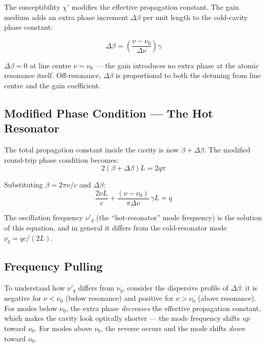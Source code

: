 The susceptibility $\chi'$ modifies the effective propagation constant. The gain medium adds an extra phase increment $\Delta\beta$ per unit length to the cold-cavity phase constant:
\begin{keyresult}
    \begin{equation}
        \Delta\beta = \left(\frac{\nu - \nu_0}{\Delta\nu}\right)\gamma
    \end{equation}
\end{keyresult}

$\Delta\beta = 0$ at line centre $\nu = \nu_0$ --- the gain introduces no extra phase at the atomic resonance itself. Off-resonance, $\Delta\beta$ is proportional to both the detuning from line centre and the gain coefficient.

\subsection{Modified Phase Condition --- The Hot Resonator}

The total propagation constant inside the cavity is now $\beta + \Delta\beta$. The modified round-trip phase condition becomes:
\begin{equation*}
    2(\beta + \Delta\beta)L = 2q\pi
\end{equation*}

Substituting $\beta = 2\pi\nu/c$ and $\Delta\beta$:
\begin{equation*}
    \frac{2\nu L}{c} + \frac{(\nu - \nu_0)}{\pi\Delta\nu}\,\gamma L = q
\end{equation*}

The oscillation frequency $\nu'_q$ (the ``hot-resonator'' mode frequency) is the solution of this equation, and in general it differs from the cold-resonator mode $\nu_q = qc/(2L)$.

\subsection{Frequency Pulling}

To understand how $\nu'_q$ differs from $\nu_q$, consider the dispersive profile of $\Delta\beta$: it is negative for $\nu < \nu_0$ (below resonance) and positive for $\nu > \nu_0$ (above resonance). For modes below $\nu_0$, the extra phase \emph{decreases} the effective propagation constant, which makes the cavity look optically shorter --- the mode frequency shifts \emph{up} toward $\nu_0$. For modes above $\nu_0$, the reverse occurs and the mode shifts \emph{down} toward $\nu_0$.

